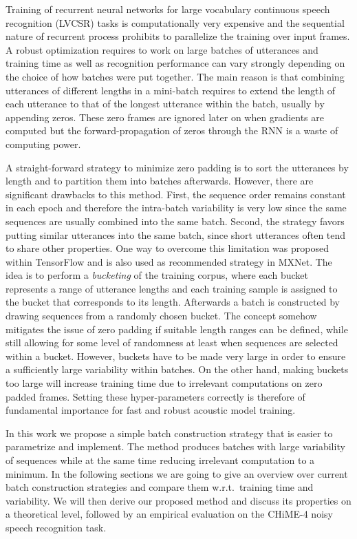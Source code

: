 \documentclass{article}
\begin{document}
    Training of recurrent neural networks for large vocabulary continuous speech recognition (LVCSR)
    tasks is computationally very expensive and the sequential nature of recurrent process prohibits to
    parallelize the training over input frames. A robust optimization requires to work on large batches of utterances
    and training time as well as recognition performance can vary strongly depending on the choice of how
    batches were put together. The main reason is that combining utterances of different lengths in a mini-batch requires 
    to extend the length of each utterance to that of the longest utterance within the batch, usually by appending zeros. These zero frames 
    are ignored later on when gradients are computed but the forward-propagation of zeros through the RNN is a waste of computing power.
    
    A straight-forward strategy to minimize zero padding is to sort the utterances by length and to partition them into
    batches afterwards. However, there are significant drawbacks to this method. First, the sequence order remains constant in each epoch 
    and therefore the intra-batch variability is very low since the same sequences are usually combined into the same batch. Second, the strategy favors putting similar utterances into the same batch, since short utterances often tend to share other properties.
    One way to overcome this limitation was proposed within TensorFlow and is also used as recommended 
    strategy in MXNet. The idea is to perform a \textit{bucketing} of the training corpus, where each bucket represents
    a range of utterance lengths and each training sample is assigned to the bucket that corresponds to its length.
    Afterwards a batch is constructed by drawing sequences from a randomly chosen bucket.
    The concept somehow mitigates the issue of zero padding if suitable length ranges can be defined, while still allowing for 
    some level of randomness at least when sequences are selected within a bucket. However, buckets have to be made very large 
    in order to ensure a sufficiently large variability within batches. On the other hand, making buckets too large will 
    increase training time due to irrelevant computations on zero padded frames. Setting these hyper-parameters correctly is
    therefore of fundamental importance for fast and robust acoustic model training.
    
    In this work we propose a simple batch construction strategy that is easier to parametrize and
    implement. The method 
    produces batches with large variability of sequences while at the same time reducing irrelevant computation to a minimum.
    In the following sections we are going to give an overview over current batch construction strategies and compare them 
    w.r.t.~training time and variability. We will then derive our proposed method and discuss its properties on a theoretical
    level, followed by an empirical evaluation on the CHiME-4 noisy speech recognition task. 
   
\end{document}
